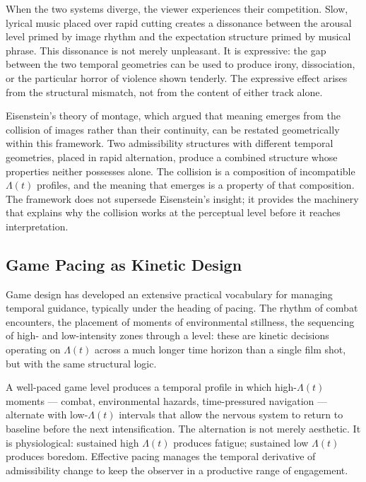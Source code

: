 \documentclass[12pt, a4paper]{article}
\theoremstyle{plain}
\theoremstyle{definition}
\theoremstyle{remark}
\begin{document}
When the two systems diverge, the viewer experiences their
competition. Slow, lyrical music placed over rapid cutting
creates a dissonance between the arousal level primed by
image rhythm and the expectation structure primed by
musical phrase. This dissonance is not merely unpleasant. It
is expressive: the gap between the two temporal geometries
can be used to produce irony, dissociation, or the
particular horror of violence shown tenderly. The expressive
effect arises from the structural mismatch, not from the
content of either track alone.

Eisenstein's theory of montage, which argued that meaning
emerges from the collision of images rather than their
continuity, can be restated geometrically within this
framework. Two admissibility structures with different
temporal geometries, placed in rapid alternation, produce
a combined structure whose properties neither possesses
alone. The collision is a composition of incompatible
$\Lambda(t)$ profiles, and the meaning that emerges is a
property of that composition. The framework does not
supersede Eisenstein's insight; it provides the machinery
that explains why the collision works at the perceptual
level before it reaches interpretation.

\subsection{Game Pacing as Kinetic Design}
\label{subsec:gamepacing}

Game design has developed an extensive practical vocabulary
for managing temporal guidance, typically under the heading
of pacing. The rhythm of combat encounters, the placement of
moments of environmental stillness, the sequencing of high-
and low-intensity zones through a level: these are kinetic
decisions operating on $\Lambda(t)$ across a much longer
time horizon than a single film shot, but with the same
structural logic.

A well-paced game level produces a temporal profile in
which high-$\Lambda(t)$ moments --- combat, environmental
hazards, time-pressured navigation --- alternate with
low-$\Lambda(t)$ intervals that allow the nervous system
to return to baseline before the next intensification. The
alternation is not merely aesthetic. It is physiological:
sustained high $\Lambda(t)$ produces fatigue; sustained
low $\Lambda(t)$ produces boredom. Effective pacing manages
the temporal derivative of admissibility change to keep the
observer in a productive range of engagement.
\end{document}
